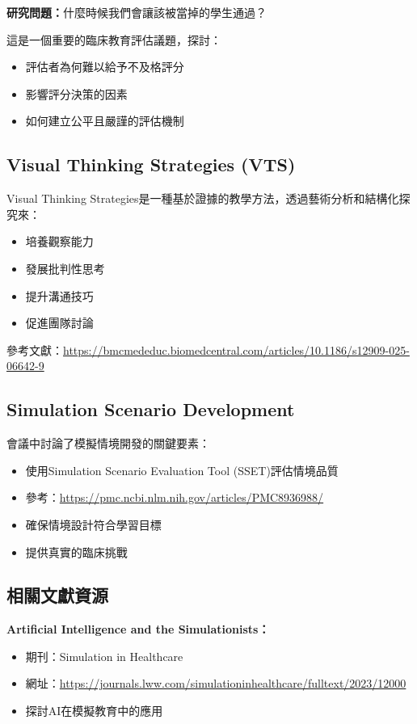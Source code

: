 \documentclass[12pt,a4paper]{article}
\begin{document}
\textbf{研究問題：}什麼時候我們會讓該被當掉的學生通過？

這是一個重要的臨床教育評估議題，探討：
\begin{itemize}[nosep]
    \item 評估者為何難以給予不及格評分
    \item 影響評分決策的因素
    \item 如何建立公平且嚴謹的評估機制
\end{itemize}

\subsection{Visual Thinking Strategies (VTS)}

Visual Thinking Strategies是一種基於證據的教學方法，透過藝術分析和結構化探究來：
\begin{itemize}[nosep]
    \item 培養觀察能力
    \item 發展批判性思考
    \item 提升溝通技巧
    \item 促進團隊討論
\end{itemize}

參考文獻：\url{https://bmcmededuc.biomedcentral.com/articles/10.1186/s12909-025-06642-9}

\subsection{Simulation Scenario Development}

會議中討論了模擬情境開發的關鍵要素：
\begin{itemize}[nosep]
    \item 使用Simulation Scenario Evaluation Tool (SSET)評估情境品質
    \item 參考：\url{https://pmc.ncbi.nlm.nih.gov/articles/PMC8936988/}
    \item 確保情境設計符合學習目標
    \item 提供真實的臨床挑戰
\end{itemize}

\subsection{相關文獻資源}

\textbf{Artificial Intelligence and the Simulationists：}
\begin{itemize}[nosep]
    \item 期刊：Simulation in Healthcare
    \item 網址：\url{https://journals.lww.com/simulationinhealthcare/fulltext/2023/12000}
    \item 探討AI在模擬教育中的應用
\end{itemize}
\end{document}
